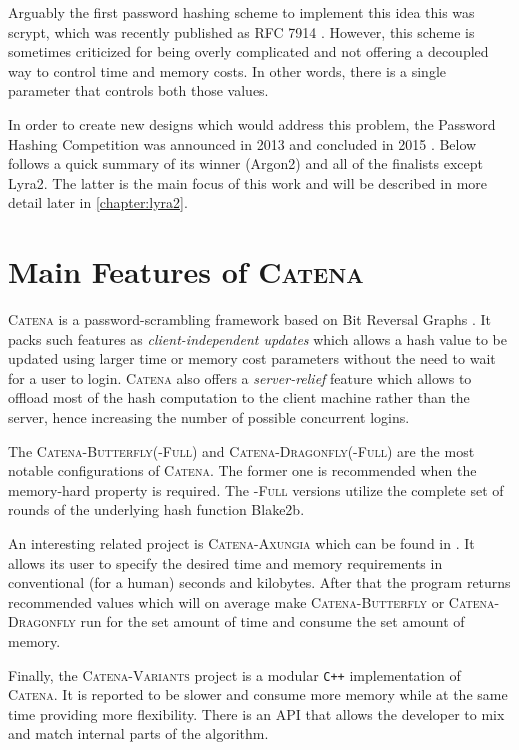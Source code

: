 Arguably the first password hashing scheme to implement this idea this was scrypt, which was recently published as RFC 7914 \cite{percival:2016:scrypt}. However, this scheme is sometimes criticized for being overly complicated and not offering a decoupled way to control time and memory costs. In other words, there is a single parameter that controls both those values.

In order to create new designs which would address this problem, the Password Hashing Competition was announced in 2013 and concluded in 2015 \cite{wetzels:2016:phc}. Below follows a quick summary of its winner (Argon2) and all of the finalists except Lyra2. The latter is the main focus of this work and will be described in more detail later in \ref{chapter:lyra2}.

\section{Main Features of \textsc{Catena}}
\label{sec:catena}

\textsc{Catena} is a password-scrambling framework based on Bit Reversal Graphs \cite{forler:2013:catena}. It packs such features as \emph{client-independent updates} which allows a hash value to be updated using larger time or memory cost parameters without the need to wait for a user to login. \textsc{Catena} also offers a \emph{server-relief} feature which allows to offload most of the hash computation to the client machine rather than the server, hence increasing the number of possible concurrent logins.

The \textsc{Catena-Butterfly(-Full)} and \textsc{Catena-Dragonfly(-Full)} are the most notable configurations of \textsc{Catena}. The former one is recommended when the memory-hard property is required. The \textsc{-Full} versions utilize the complete set of rounds of the underlying hash function Blake2b.

An interesting related project is \textsc{Catena-Axungia} which can be found in \cite{github:2017:catena-axungia}. It allows its user to specify the desired time and memory requirements in conventional (for a human) seconds and kilobytes. After that the program returns recommended values which will on average make \textsc{Catena-Butterfly} or \textsc{Catena-Dragonfly} run for the set amount of time and consume the set amount of memory.

Finally, the \textsc{Catena-Variants} \cite{github:2017:catena-variants} project is a modular \texttt{C++} implementation of \textsc{Catena}. It is reported to be slower and consume more memory while at the same time providing more flexibility. There is an API that allows the developer to mix and match internal parts of the algorithm.

